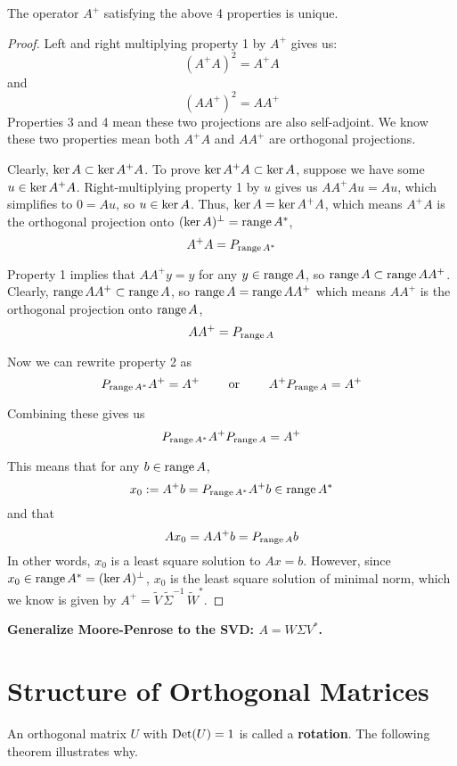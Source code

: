 \begin{theorem}
The operator $A^{+}$ satisfying the above 4 properties is unique. 
\end{theorem}

\begin{proof}
Left and right multiplying property 1 by $A^{+}$ gives us: 
$$(A^{+} A)^{2} = A^{+} A$$ 
and
$$ (AA^{+})^{2} = AA^{+}$$
Properties 3 and 4 mean these two projections are also self-adjoint. We know these two properties mean both $A^{+}A$ and $AA^{+}$ are orthogonal projections.  

Clearly, $\operatorname{ker} A \subset \operatorname{ker} A^{+}A$. To prove $\operatorname{ker} A^{+}A \subset \operatorname{ker} A$, suppose we have some $u \in \operatorname{ker} A^{+}A$. Right-multiplying property 1 by $u$ gives us $AA^{+}Au = Au$, which simplifies to $0 = Au$, so $u \in \operatorname{ker} A$. Thus, $\operatorname{ker} A = \operatorname{ker} A^{+}A$, which means $A^{+}A$ is the orthogonal projection onto $(\operatorname{ker} A)^{\perp} = \operatorname{range} A^{*}$, 
$$A^{+}A = P_{\operatorname{range} A^{*}}$$

Property 1 implies that $AA^{+} y = y$ for any $y \in \operatorname{range} A$, so $\operatorname{range} A \subset \operatorname{range} AA^{+}$. Clearly, $\operatorname{range} AA^{+} \subset \operatorname{range} A$, so $\operatorname{range} A = \operatorname{range} AA^{+}$ which means $AA^{+}$ is the orthogonal projection onto $\operatorname{range} A$, 
$$AA^{+} = P_{\operatorname{range} A}$$

Now we can rewrite property 2 as 
$$P_{\operatorname{range} A^{*}} A^{+} = A^{+} \qquad \text{ or } \qquad A^{+} P_{\operatorname{range} A} = A^{+}$$

Combining these gives us 
$$P_{\operatorname{range} A^{*}} A^{+} P_{\operatorname{range} A} = A^{+}$$

This means that for any $b \in \operatorname{range} A$, 
$$x_{0} := A^{+} b = P_{\operatorname{range} A^{*}} A^{+} b \in \operatorname{range} A^{*}$$
and that 
$$Ax_{0} = AA^{+} b = P_{\operatorname{range} A} b$$
In other words, $x_{0}$ is a least square solution to $Ax = b$. However, since $x_{0} \in \operatorname{range} A^{*} = (\operatorname{ker} A)^{\perp}$, $x_{0}$ is the least square solution of minimal norm, which we know is given by $A^{+} = \widetilde{V} \, \widetilde{\Sigma}^{-1} \, \widetilde{W}^{*}$.
\end{proof}

\textbf{Generalize Moore-Penrose to the SVD: $A = W\Sigma V^{*}$. }

\section{Structure of Orthogonal Matrices}

An orthogonal matrix $U$ with $\operatorname{Det}(U) = 1$ is called a \textbf{rotation}. The following theorem illustrates why. 

